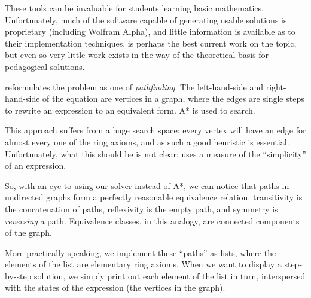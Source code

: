 \documentclass[acmsmall,review,anonymous]{acmart}\settopmatter{printfolios=true,printccs=false,printacmref=false}
\begin{document}
These tools can be invaluable for students learning basic mathematics.
Unfortunately, much of the software capable of generating usable solutions is
proprietary (including Wolfram Alpha), and little information is available as to
their implementation techniques.\cite{lioubartsev_constructing_2016} is perhaps
the best current work on the topic, but even so very little work exists in the
way of the theoretical basis for pedagogical solutions.

\citet{lioubartsev_constructing_2016} reformulates the problem as one of
\emph{pathfinding}. The left-hand-side and right-hand-side of the equation are
vertices in a graph, where the edges are single steps to rewrite an expression
to an equivalent form. A* is used to search.

This approach suffers from a huge search space: every vertex will have an edge
for almost every one of the ring axioms, and as such a good heuristic is
essential. Unfortunately, what this should be is not
clear: \citet{lioubartsev_constructing_2016} uses a measure of the ``simplicity''
of an expression.

So, with an eye to using our solver instead of A*, we can notice that paths in
undirected graphs form a perfectly reasonable equivalence relation: transitivity
is the concatenation of paths, reflexivity is the empty path, and symmetry is
\emph{reversing} a path. Equivalence classes, in this analogy, are connected
components of the graph.

More practically speaking, we implement these ``paths'' as lists, where the
elements of the list are elementary ring axioms. When we want to display a
step-by-step solution, we simply print out each element of the list in turn,
interspersed with the states of the expression (the vertices in the graph).
\begin{multicols}{2}
\end{multicols}
\end{document}
